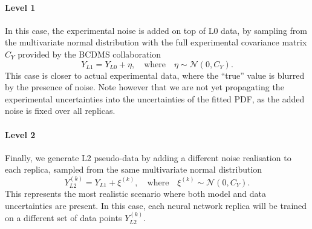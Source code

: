 \paragraph{Level 1}
In this case, the experimental noise is added on top of L0 data, by sampling from the
multivariate normal distribution with the full experimental covariance matrix
$C_Y$ provided by the BCDMS collaboration
\begin{equation}
Y_{L1} =  Y_{L0} + \eta, \quad \textrm{where} \quad \eta \sim \mathcal{N}(0, C_Y).
\end{equation}
This case is closer to actual experimental data, where the ``true'' value is
blurred by the presence of noise. Note however that we are not yet propagating
the experimental uncertainties into the uncertainties of the fitted PDF, as the added
noise is fixed over all replicas.

\paragraph{Level 2}
Finally, we generate L2 pseudo-data by adding a different noise realisation to each
replica, sampled from the same multivariate normal distribution
\begin{equation}
Y_{L2}^{(k)} =  Y_{L1} + \xi^{(k)}, \quad \textrm{where} \quad \xi^{(k)} \sim \mathcal{N}(0, C_Y).
\end{equation}
This represents the most realistic scenario where both model and data uncertainties
are present. In this case, each neural network replica will be trained on a
different set of data points $Y_{L2}^{(k)}$.